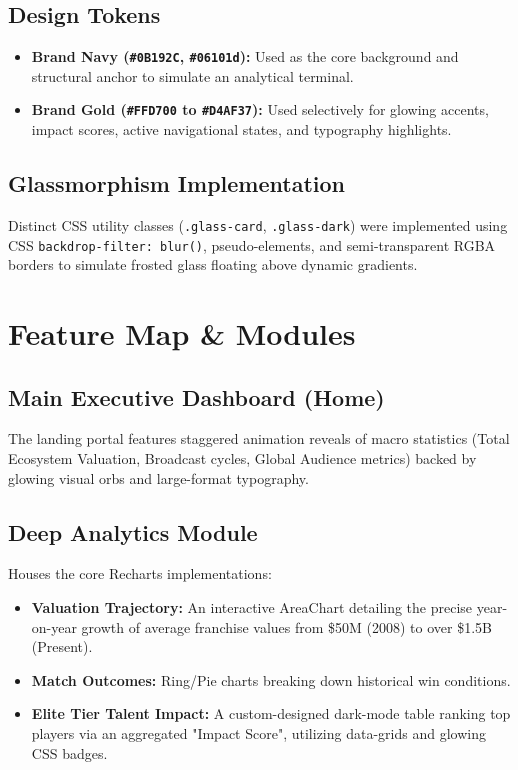 \documentclass[12pt,a4paper]{article}
\begin{document}
\subsection{Design Tokens}
\begin{itemize}
    \item \textbf{Brand Navy (\texttt{\#0B192C}, \texttt{\#06101d}):} Used as the core background and structural anchor to simulate an analytical terminal.
    \item \textbf{Brand Gold (\texttt{\#FFD700} to \texttt{\#D4AF37}):} Used selectively for glowing accents, impact scores, active navigational states, and typography highlights.
\end{itemize}

\subsection{Glassmorphism Implementation}
Distinct CSS utility classes (\texttt{.glass-card}, \texttt{.glass-dark}) were implemented using CSS \texttt{backdrop-filter: blur()}, pseudo-elements, and semi-transparent RGBA borders to simulate frosted glass floating above dynamic gradients.

\section{Feature Map \& Modules}

\subsection{Main Executive Dashboard (Home)}
The landing portal features staggered animation reveals of macro statistics (Total Ecosystem Valuation, Broadcast cycles, Global Audience metrics) backed by glowing visual orbs and large-format typography.

\subsection{Deep Analytics Module}
Houses the core Recharts implementations:
\begin{itemize}
    \item \textbf{Valuation Trajectory:} An interactive AreaChart detailing the precise year-on-year growth of average franchise values from \$50M (2008) to over \$1.5B (Present).
    \item \textbf{Match Outcomes:} Ring/Pie charts breaking down historical win conditions.
    \item \textbf{Elite Tier Talent Impact:} A custom-designed dark-mode table ranking top players via an aggregated "Impact Score", utilizing data-grids and glowing CSS badges.
\end{itemize}
\end{document}
